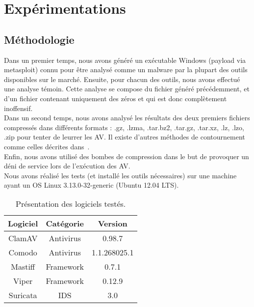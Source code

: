 \documentclass{svjour3}
\begin{document}
\section{Expérimentations}
\label{3.expérimentations}

\subsection{Méthodologie}
\label{3.1méthodologie}
Dans un premier temps, nous avons généré un exécutable Windows (payload via metasploit) connu pour être analysé comme un malware par la plupart des outils disponibles sur le marché. Ensuite, pour chacun des outils, nous avons effectué une analyse témoin. Cette analyse se compose du fichier généré précédemment, et d'un fichier contenant uniquement des zéros et qui est donc complètement inoffensif.\\
Dans un second temps, nous avons analysé les résultats des deux premiers fichiers compressés dans différents formats : .gz, .lzma, .tar.bz2, .tar.gz, .tar.xz, .lz, .lzo, .zip pour tenter de leurrer les AV. Il existe d'autres méthodes de contournement comme celles décrites dans~\cite{Contournement}.\\
Enfin, nous avons utilisé des bombes de compression dans le but de provoquer un déni de service lors de l'exécution des AV.\\
$ $\\
Nous avons réalisé les tests (et installé les outils nécessaires) sur une machine ayant un OS Linux 3.13.0-32-generic (Ubuntu 12.04 LTS).
\begin{table}[ht!]
	\begin{center}
		\begin{normalsize}
			\begin{tabular}{|c|c|c|}
    				\hline
     			\textbf{Logiciel} & \textbf{Catégorie} & \textbf{Version}\\
    				\hline
    				ClamAV & Antivirus & 0.98.7\\ 			
    				\hline
    				Comodo & Antivirus & 1.1.268025.1\\
    				\hline
    				\hline
    				Mastiff & Framework & 0.7.1\\
    				\hline
    				Viper & Framework & 0.12.9\\
    				\hline
    				\hline
    				Suricata & IDS & 3.0\\
    				\hline
 			\end{tabular}
 		\end{normalsize}
	\end{center}
	\caption{Présentation des logiciels testés.}
\end{table}
\end{document}
